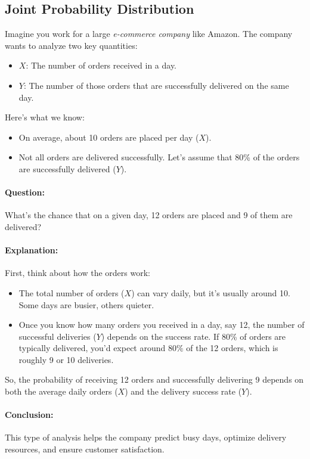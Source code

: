 \documentclass[a4paper]{article}
\begin{document}
\subsection{Joint Probability Distribution}

Imagine you work for a large \textit{e-commerce company} like Amazon. The company wants to analyze two key quantities:
\begin{itemize}
    \item \(X\): The number of orders received in a day.
    \item \(Y\): The number of those orders that are successfully delivered on the same day.
\end{itemize}

Here’s what we know:
\begin{itemize}
    \item On average, about 10 orders are placed per day (\(X\)).
    \item Not all orders are delivered successfully. Let’s assume that 80\% of the orders are successfully delivered (\(Y\)).
\end{itemize}

\paragraph{Question:} 
What’s the chance that on a given day, 12 orders are placed and 9 of them are delivered?

\paragraph{Explanation:} 
First, think about how the orders work:
\begin{itemize}
\item The total number of orders (\(X\)) can vary daily, but it’s usually around 10. Some days are busier, others quieter.
\item Once you know how many orders you received in a day, say 12, the number of successful deliveries (\(Y\)) depends on the success rate. If 80\% of orders are typically delivered, you’d expect around \(80\%\) of the 12 orders, which is roughly 9 or 10 deliveries.
\end{itemize}
So, the probability of receiving 12 orders and successfully delivering 9 depends on both the average daily orders (\(X\)) and the delivery success rate (\(Y\)).

\paragraph{Conclusion:} 
This type of analysis helps the company predict busy days, optimize delivery resources, and ensure customer satisfaction.
\end{document}
